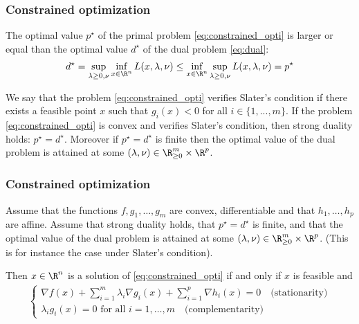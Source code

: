 \documentclass{beamer}
\begin{document}
\begin{frame}[t] 
\frametitle{Constrained optimization}
\vspace{-10pt}
\begin{theorem}
The optimal value $p^{\star}$ of the primal problem \eqref{eq:constrained_opti} is larger or equal than the optimal value $d^{\star}$ of the dual problem \eqref{eq:dual}:
\begin{align*}
d^{\star} = \sup_{\lambda \geq 0, \nu} \inf_{x \in \R^n} L(x, \lambda, \nu) \leq \inf_{x \in \R^n}  \sup_{\lambda \geq 0, \nu} L(x, \lambda, \nu) = p^{\star}
\end{align*}
\end{theorem}

\begin{theorem}
We say that the problem \eqref{eq:constrained_opti} verifies Slater’s condition if there exists a feasible point $x$ such
that $g_i(x) < 0$ for all $i \in \{1,...,m \}$. If the problem \eqref{eq:constrained_opti} is convex and verifies Slater’s condition, then strong duality holds: $p^{\star} = d^{\star}$. Moreover if $p^{\star} = d^{\star}$ is finite then the optimal value of the dual problem is attained at some $(\lambda, \nu) \in \R^m_{\geq 0} \times \R^p$.
\end{theorem}
\end{frame}

\begin{frame}[t] 
\frametitle{Constrained optimization}
\begin{theorem}
Assume that the functions $f, g_1, \dots, g_m$ are convex, differentiable and that $h_1, \dots, h_p$ are affine. Assume that strong duality holds, that $p^{\star} = d^{\star}$ is finite, and that the optimal value of the dual problem is attained at some $(\lambda, \nu) \in \R^m_{\geq 0} \times \R^p$. (This is for instance the case under Slater's condition).

Then $x \in \R^n$ is a solution of \eqref{eq:constrained_opti} if and only if $x$ is feasible and
\begin{align*}
\begin{cases}
\nabla f (x) + \sum_{i=1}^m \lambda_i \nabla g_i(x) + \sum_{i=1}^p \nabla h_i(x) = 0 \quad \text{(stationarity)}\\
\lambda_i g_i(x) = 0 \text{ for all } i = 1, \dots, m \quad \text{(complementarity)}
\end{cases}
\end{align*}
\end{theorem}
\end{frame}
\end{document}
